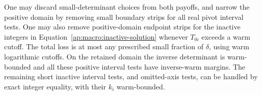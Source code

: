 \begin{lemma}\label{ap:macro:boundary}
One may discard small-determinant choices from both payoffs, and narrow
the positive domain by removing small boundary strips for all real
pivot interval tests.  One may also remove positive-domain endpoint
strips for the inactive integers in
Equation~\eqref{ap:macro:inactive-solution} whenever $T_{0i}$ exceeds
a warm cutoff.  The total loss is at most any prescribed small
fraction of $\delta$, using warm logarithmic cutoffs.  On the retained
domain the inverse determinant is warm-bounded and all these positive
interval tests have inverse-warm margins.  The remaining short
inactive interval tests, and omitted-axis tests, can be handled by
exact integer equality, with their $k_i$ warm-bounded.
\end{lemma}

